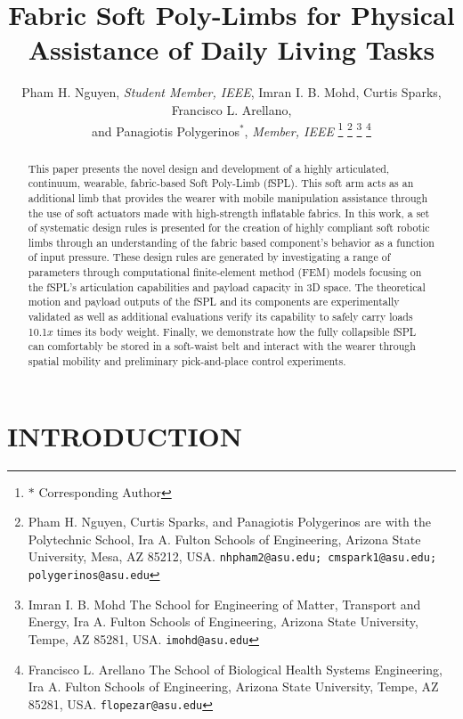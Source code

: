 \documentclass[letterpaper, 10 pt, conference]{ieeeconf}  %
\title{\LARGE \bf
Fabric Soft Poly-Limbs for Physical Assistance of Daily Living Tasks  
% 
% 
}
\author{Pham H. Nguyen, \textit{Student Member, IEEE}, Imran I. B. Mohd, Curtis Sparks, Francisco L. Arellano,\\ and Panagiotis Polygerinos$^{*}$, \textit{Member, IEEE}%
\thanks{$*$ Corresponding Author}%
\thanks{Pham H. Nguyen, Curtis Sparks, and Panagiotis Polygerinos are with the Polytechnic School, Ira A. Fulton Schools of Engineering, Arizona State University, Mesa, AZ 85212, USA. 
         {\tt\small nhpham2@asu.edu; cmspark1@asu.edu; polygerinos@asu.edu}}%
\thanks{Imran I. B. Mohd The School for Engineering of Matter, Transport and Energy, Ira A. Fulton Schools of Engineering, Arizona State University, Tempe, AZ 85281, USA.
        {\tt\small imohd@asu.edu}}%
\thanks{Francisco L. Arellano The School of Biological Health Systems Engineering, Ira A. Fulton Schools of Engineering, Arizona State University, Tempe, AZ 85281, USA.
        {\tt\small flopezar@asu.edu}}%
}
\begin{document}
\maketitle
\thispagestyle{empty}
\pagestyle{empty}


\begin{abstract}

This paper presents the novel design and development of a highly articulated, continuum, wearable, fabric-based Soft Poly-Limb (fSPL). This soft arm acts as an additional limb that provides the wearer with mobile manipulation assistance through the use of soft actuators made with high-strength inflatable fabrics. In this work, a set of systematic design rules is presented for the creation of highly compliant soft robotic limbs through an understanding of the fabric based component’s behavior as a function of input pressure. These design rules are generated by investigating a range of parameters through computational finite-element method (FEM) models focusing on the fSPL's articulation capabilities and payload capacity in 3D space. The theoretical motion and payload outputs of the fSPL and its components are experimentally validated as well as additional evaluations verify its capability to safely carry loads 10.1$x$ times its body weight. Finally, we demonstrate how the fully collapsible fSPL can comfortably be stored in a soft-waist belt and interact with the wearer through spatial mobility and preliminary pick-and-place control experiments.


% 
% 

\end{abstract}

\section{INTRODUCTION}
\end{document}
